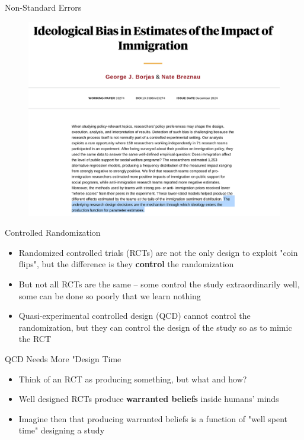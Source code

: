 \documentclass{beamer}
\begin{document}
\begin{frame}{Non-Standard Errors}
 
\begin{figure}
    \centering
    \includegraphics[height=0.9\textheight]{./lecture_includes/borjas_design}
\end{figure}

\end{frame}







\begin{frame}{Controlled Randomization}

\begin{itemize}
\item Randomized controlled trials (RCTs) are not the only design to exploit "coin flips", but the difference is they \textbf{control} the randomization 
\item But not all RCTs are the same -- some control the study extraordinarily well, some can be done so poorly that we learn nothing
\item Quasi-experimental controlled design (QCD) cannot control the randomization, but they can control the design of the study so as to mimic the RCT

\end{itemize}

\end{frame}

	 



\begin{frame}{QCD Needs More "Design Time}

\begin{itemize}
\item Think of an RCT as producing something, but what and how?
\item Well designed RCTs produce \textbf{warranted beliefs} inside humans' minds
\item Imagine then that producing warranted beliefs is a function of "well spent time" designing a study
\end{itemize}

\end{frame}
\end{document}
